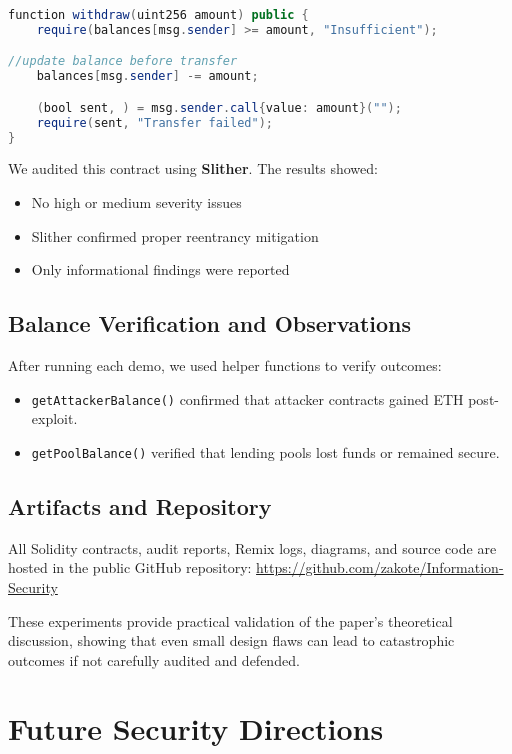 \documentclass[conference]{IEEEtran}
\begin{document}
\begin{lstlisting}[language=Java, caption={Safe withdraw using effect-before-interaction}]
function withdraw(uint256 amount) public {
    require(balances[msg.sender] >= amount, "Insufficient");

//update balance before transfer
    balances[msg.sender] -= amount;

    (bool sent, ) = msg.sender.call{value: amount}("");
    require(sent, "Transfer failed");
}
\end{lstlisting}

We audited this contract using \textbf{Slither}. The results showed:
\begin{itemize}
    \item No high or medium severity issues
    \item Slither confirmed proper reentrancy mitigation
    \item Only informational findings were reported
\end{itemize}

\subsection{Balance Verification and Observations}

After running each demo, we used helper functions to verify outcomes:
\begin{itemize}
  \item \texttt{getAttackerBalance()} confirmed that attacker contracts gained ETH post-exploit.
  \item \texttt{getPoolBalance()} verified that lending pools lost funds or remained secure.
\end{itemize}

\subsection{Artifacts and Repository}

All Solidity contracts, audit reports, Remix logs, diagrams, and source code are hosted in the public GitHub repository:  
\url{https://github.com/zakote/Information-Security}

These experiments provide practical validation of the paper’s theoretical discussion, showing that even small design flaws can lead to catastrophic outcomes if not carefully audited and defended.

\section{Future Security Directions}
\end{document}
